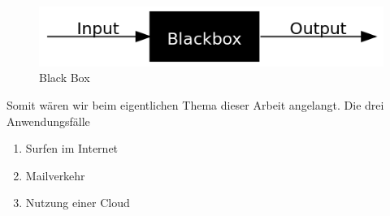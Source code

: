 \begin{figure}
\centering
\includegraphics[scale=0.75]{images/BlackBox}
\caption{Black Box}
\end{figure}

Somit wären wir beim eigentlichen Thema dieser Arbeit angelangt. Die drei Anwendungsfälle

\begin{enumerate}
\item Surfen im Internet
\item Mailverkehr
\item Nutzung einer Cloud
\end{enumerate}

